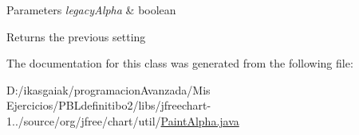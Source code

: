 \begin{DoxyParams}{Parameters}
{\em legacy\+Alpha} & boolean\\
\hline
\end{DoxyParams}
\begin{DoxyReturn}{Returns}
the previous setting 
\end{DoxyReturn}


The documentation for this class was generated from the following file\+:\begin{DoxyCompactItemize}
\item 
D\+:/ikasgaiak/programacion\+Avanzada/\+Mis Ejercicios/\+P\+B\+Ldefinitibo2/libs/jfreechart-\/1../source/org/jfree/chart/util/\mbox{\hyperlink{_paint_alpha_8java}{Paint\+Alpha.\+java}}\end{DoxyCompactItemize}
